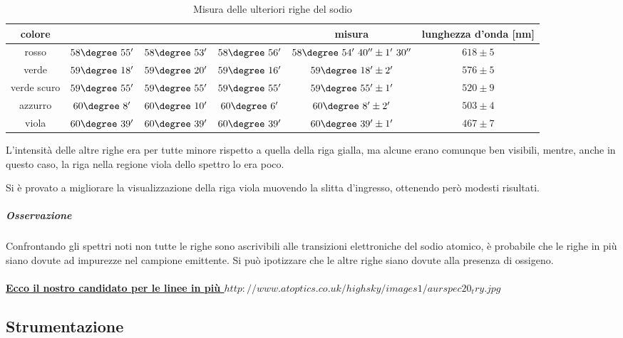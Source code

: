 \documentclass[a4paper,10pt]{article}
\begin{document}
{{{{{{\begin{table}[H]
	\centering
	\begin{tabular}{c|c|c|c|c|c}
		colore &	&	&	& misura & lunghezza d'onda [nm]\\
		\hline
		rosso &	$58\degree~55'$ & $58\degree~53'$ & $58\degree~56'$ & $58\degree~54'~40'' \pm 1'~30''$ & $618 \pm 5$\\
		verde & $59\degree~18'$ & $59\degree~20'$ & $59\degree~16'$ & $59\degree~18' \pm 2'$  & $576 \pm 5$\\
		verde scuro & $59\degree~55'$ & $59\degree~55'$ & $59\degree~55'$ & $59\degree~55' \pm 1'$ & $520 \pm 9$\\
		azzurro & $60\degree~8'$ & $60\degree~10'$ & $60\degree~6'$ & $60\degree~8' \pm 2'$& $503 \pm 4$\\
		viola & $60\degree~39'$ & $60\degree~39'$ & $60\degree~39'$ & $60\degree~39' \pm 1'$ & $467 \pm 7$\\	
	\end{tabular}
	\caption{Misura delle ulteriori righe del sodio}
	\label{tab:moreNa}
\end{table}

L'intensità delle altre righe era per tutte minore rispetto a quella della riga gialla, ma alcune erano comunque ben visibili, mentre, anche in questo caso, la riga nella regione viola dello spettro lo era poco.

Si è provato a migliorare la visualizzazione della riga viola muovendo la slitta d'ingresso, ottenendo però modesti risultati.

\subparagraph{Osservazione} Confrontando gli spettri noti non tutte le righe sono ascrivibili alle transizioni elettroniche del sodio atomico, è probabile che le righe in più siano dovute ad impurezze nel campione emittente. Si può ipotizzare che le altre righe siano dovute alla presenza di ossigeno.
\\\\
\underline{\textbf{Ecco il nostro candidato per le linee in più $http://www.atoptics.co.uk/highsky/images1/aurspec20_try.jpg$}}

\subsection{Strumentazione}

}}}}}}
\end{document}
